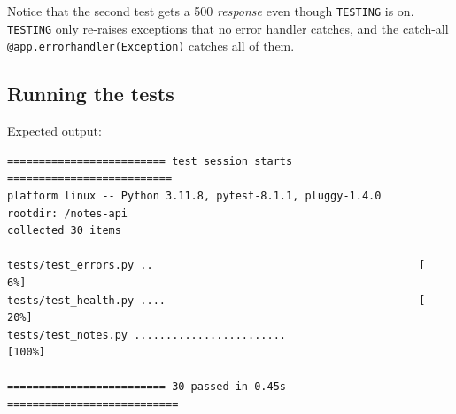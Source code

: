 \noindent{}Notice that the second test gets a 500 \emph{response} even though \texttt{TESTING} is on. \texttt{TESTING} only re-raises exceptions that no error handler catches, and the catch-all \texttt{@app.}\allowbreak{}\texttt{errorhandler(Exception)} catches all of them.

\subsection*{Running the tests}\label{17-build-process:running-the-tests}

\begin{codebox}

\begin{Shaded}
\begin{Highlighting}[]

 




 

 
\end{Highlighting}
\end{Shaded}

\end{codebox}

\noindent{}Expected output:

\begin{outputbox}[short]
\begin{Verbatim}[fontsize=\codesize, breaklines, breakanywhere, breaksymbolleft={\tiny\textcolor{muted}{$\hookrightarrow$}}]
========================= test session starts ==========================
platform linux -- Python 3.11.8, pytest-8.1.1, pluggy-1.4.0
rootdir: /notes-api
collected 30 items

tests/test_errors.py ..                                          [  6%]
tests/test_health.py ....                                        [ 20%]
tests/test_notes.py ........................                     [100%]

========================= 30 passed in 0.45s ===========================
\end{Verbatim}
\end{outputbox}

